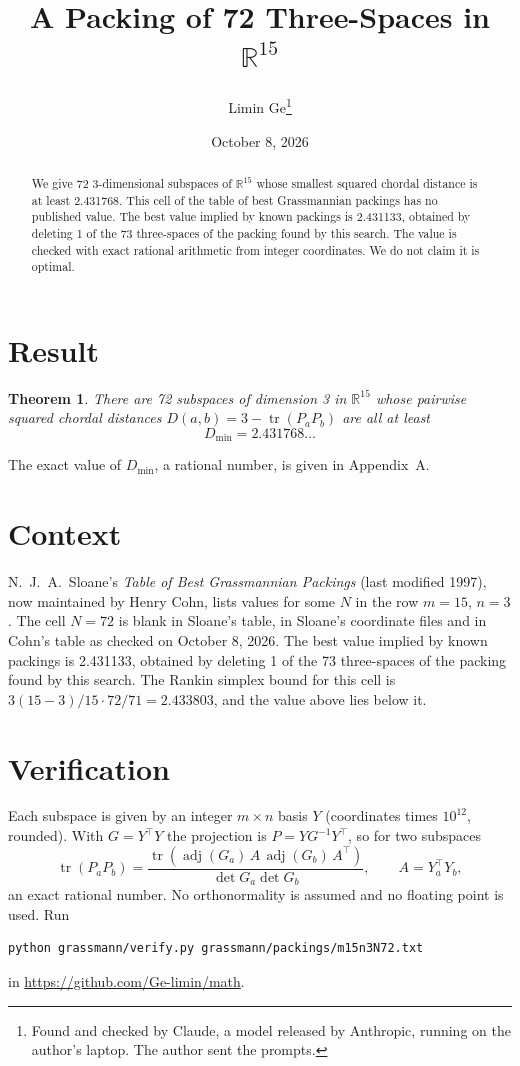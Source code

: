 \documentclass[11pt,a4paper]{article}
\title{A Packing of 72 Three-Spaces in $\mathbb{R}^{15}$}
\author{Limin Ge\thanks{Found and checked by Claude, a model released by Anthropic, running on the author's laptop. The author sent the prompts.}}
\date{October 8, 2026}
\newtheorem*{theorem}{Theorem}
\begin{document}
\maketitle
\begin{abstract}
We give 72 3-dimensional subspaces of $\mathbb{R}^{15}$ whose smallest squared chordal distance is at least 2.431768. This cell of the table of best Grassmannian packings has no published value. The best value implied by known packings is 2.431133, obtained by deleting 1 of the 73 three-spaces of the packing found by this search. The value is checked with exact rational arithmetic from integer coordinates. We do not claim it is optimal.
\end{abstract}

\section{Result}
\begin{theorem}
There are 72 subspaces of dimension 3 in $\mathbb{R}^{15}$ whose pairwise squared chordal distances $D(a,b) = 3 - \operatorname{tr}(P_aP_b)$ are all at least
\[ D_{\min} = 2.431768\ldots \]
\end{theorem}
The exact value of $D_{\min}$, a rational number, is given in Appendix~A.


\section{Context}
N.~J.~A.~Sloane's \emph{Table of Best Grassmannian Packings} (last modified 1997), now maintained by Henry Cohn, lists values for some $N$ in the row $m=15$, $n=3$. The cell $N=72$ is blank in Sloane's table, in Sloane's coordinate files and in Cohn's table as checked on October 8, 2026. The best value implied by known packings is 2.431133, obtained by deleting 1 of the 73 three-spaces of the packing found by this search. The Rankin simplex bound for this cell is $3(15-3)/15\cdot 72/71 = 2.433803$, and the value above lies below it.


\section{Verification}
Each subspace is given by an integer $m\times n$ basis $Y$ (coordinates times $10^{12}$, rounded). With $G=Y^\top Y$ the projection is $P=YG^{-1}Y^\top$, so for two subspaces
\[ \operatorname{tr}(P_aP_b)=\frac{\operatorname{tr}(\operatorname{adj}(G_a)\,A\,\operatorname{adj}(G_b)\,A^\top)}{\det G_a\det G_b},\qquad A=Y_a^\top Y_b, \]
an exact rational number. No orthonormality is assumed and no floating point is used. Run
\begin{verbatim}
python grassmann/verify.py grassmann/packings/m15n3N72.txt
\end{verbatim}
in \url{https://github.com/Ge-limin/math}.
\end{document}
